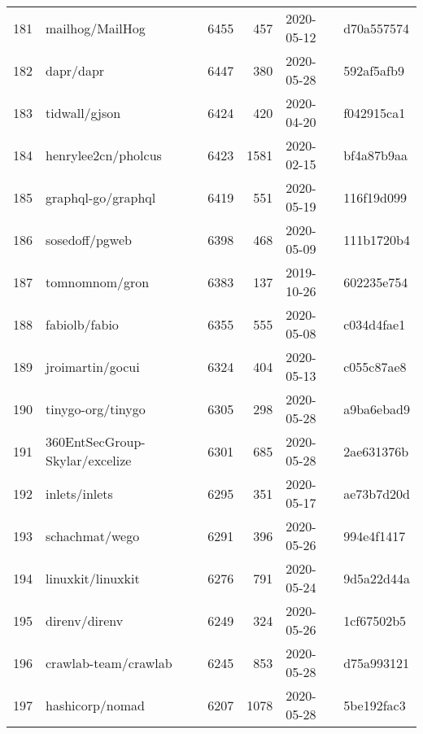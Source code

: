 \begin{footnotesize}
\begin{longtable}{llrrll}
        181 &                                    mailhog/MailHog &   6455 &    457 & 2020-05-12 &  d70a557574 \\
        182 &                                          dapr/dapr &   6447 &    380 & 2020-05-28 &  592af5afb9 \\
        183 &                                      tidwall/gjson &   6424 &    420 & 2020-04-20 &  f042915ca1 \\
        184 &                                henrylee2cn/pholcus &   6423 &   1581 & 2020-02-15 &  bf4a87b9aa \\
        185 &                                 graphql-go/graphql &   6419 &    551 & 2020-05-19 &  116f19d099 \\
        186 &                                     sosedoff/pgweb &   6398 &    468 & 2020-05-09 &  111b1720b4 \\
        187 &                                     tomnomnom/gron &   6383 &    137 & 2019-10-26 &  602235e754 \\
        188 &                                      fabiolb/fabio &   6355 &    555 & 2020-05-08 &  c034d4fae1 \\
        189 &                                   jroimartin/gocui &   6324 &    404 & 2020-05-13 &  c055c87ae8 \\
        190 &                                  tinygo-org/tinygo &   6305 &    298 & 2020-05-28 &  a9ba6ebad9 \\
        191 &                     360EntSecGroup-Skylar/excelize &   6301 &    685 & 2020-05-28 &  2ae631376b \\
        192 &                                      inlets/inlets &   6295 &    351 & 2020-05-17 &  ae73b7d20d \\
        193 &                                     schachmat/wego &   6291 &    396 & 2020-05-26 &  994e4f1417 \\
        194 &                                  linuxkit/linuxkit &   6276 &    791 & 2020-05-24 &  9d5a22d44a \\
        195 &                                      direnv/direnv &   6249 &    324 & 2020-05-26 &  1cf67502b5 \\
        196 &                               crawlab-team/crawlab &   6245 &    853 & 2020-05-28 &  d75a993121 \\
        197 &                                    hashicorp/nomad &   6207 &   1078 & 2020-05-28 &  5be192fac3 \\

\end{longtable}
\end{footnotesize}
